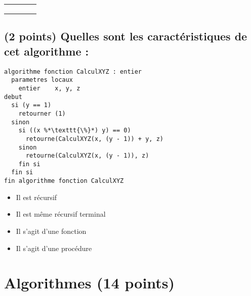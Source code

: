\documentclass[11pt,a4paper]{article}
\begin{document}
\begin{table}[h!]
\begin{minipage}{0.4\textwidth}
\begin{tabular}{| C{1cm} | C{1cm} | C{1cm} | C{1cm} |}
             &     &     &       \\
        \hline
             &     &     &       \\
             &     &     &       \\
             &     &     &       \\
        \hline
    \end{tabular}
  \end{minipage}
\end{table}


\bigskip


\subsection{(2 points) Quelles sont les caractéristiques de cet algorithme : }

\bigskip

\begin{lstlisting}[style=algorithmique]
algorithme fonction CalculXYZ : entier
  parametres locaux
    entier    x, y, z
debut
  si (y == 1)
    retourner (1)
  sinon
    si ((x %*\texttt{\%}*) y) == 0)
      retourne(CalculXYZ(x, (y - 1)) + y, z)
    sinon
      retourne(CalculXYZ(x, (y - 1)), z)
    fin si
  fin si
fin algorithme fonction CalculXYZ \end{lstlisting}

\begin{itemize}
  \item[\CaseCoche] Il est récursif
  \item[\CaseCoche] Il est même récursif terminal
  \item[\CaseCoche] Il s'agit d'une fonction
  \item[\CaseCoche] Il s'agit d'une procédure
\end{itemize}

\bigskip

%
\section{Algorithmes (14 points)}


\end{document}
